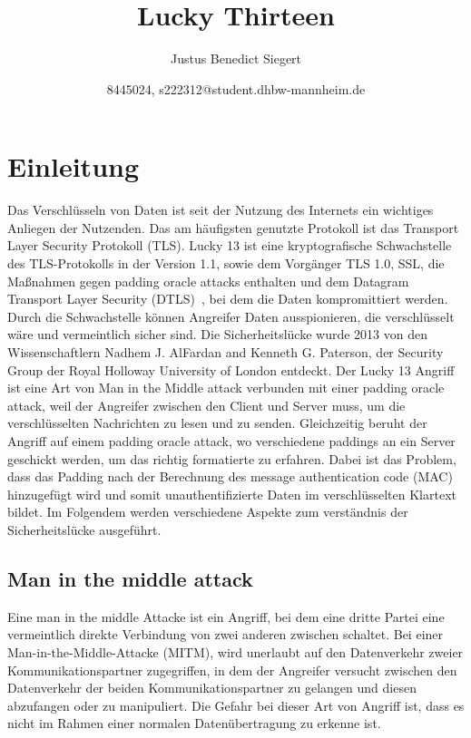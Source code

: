 \documentclass[a4paper,10pt]{scrartcl}
\begin{document}
    \title{Lucky Thirteen}
    \author{Justus Benedict Siegert}
    \date{8445024, s222312@student.dhbw-mannheim.de}
    \maketitle
    \tableofcontents
    \newpage


    \section{Einleitung}\label{sec:einleitung}
    Das Verschlüsseln von Daten ist seit der Nutzung des Internets ein wichtiges Anliegen der Nutzenden.
    Das am häufigsten genutzte Protokoll ist das Transport Layer Security Protokoll (TLS).
    Lucky 13 ist eine kryptografische Schwachstelle des TLS-Protokolls in der Version 1.1, sowie dem Vorgänger TLS 1.0, SSL, die Maßnahmen gegen padding oracle attacks enthalten und dem Datagram Transport Layer Security (DTLS)~\cite[S.2]{AlFardan2013},
    bei dem die Daten kompromittiert werden.
    Durch die Schwachstelle können Angreifer Daten ausspionieren, die verschlüsselt wäre und vermeintlich sicher sind.
    Die Sicherheitslücke wurde 2013 von den Wissenschaftlern Nadhem J. AlFardan and Kenneth G. Paterson, der Security Group der Royal Holloway University of London entdeckt.
    \newline
    Der Lucky 13 Angriff ist eine Art von Man in the Middle attack verbunden mit einer padding oracle attack, weil der Angreifer zwischen den Client und Server muss, um die verschlüsselten Nachrichten zu lesen und zu senden.
    Gleichzeitig beruht der Angriff auf einem padding oracle attack, wo verschiedene paddings an ein Server geschickt werden, um das richtig formatierte zu erfahren.
    Dabei ist das Problem, dass das Padding nach der Berechnung des message authentication code (MAC) hinzugefügt wird und somit unauthentifizierte Daten im verschlüsselten Klartext bildet.
    Im Folgendem werden verschiedene Aspekte zum verständnis der Sicherheitslücke ausgeführt.

    \subsection{Man in the middle attack}\label{subsec:man-in-the-middle-attack}
    Eine man in the middle Attacke ist ein Angriff, bei dem eine dritte Partei eine vermeintlich direkte Verbindung von zwei anderen zwischen schaltet.
    Bei einer Man-in-the-Middle-Attacke (MITM), wird unerlaubt auf den Datenverkehr zweier Kommunikationspartner zugegriffen, in dem der Angreifer versucht zwischen den Datenverkehr der beiden Kommunikationspartner zu gelangen und diesen abzufangen oder zu manipuliert.
    Die Gefahr bei dieser Art von Angriff ist, dass es nicht im Rahmen einer normalen Datenübertragung zu erkenne ist.
\end{document}
